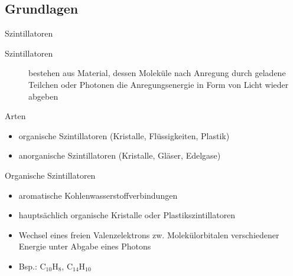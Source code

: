 \subsection[]{Grundlagen}

\begin{frame}{Szintillatoren}

\begin{description}
	  \item[Szintillatoren] bestehen aus Material, dessen Moleküle nach Anregung durch geladene
	  Teilchen oder Photonen die Anregungsenergie in Form von Licht wieder abgeben
	\end{description}
	\begin{block}{Arten}
		\begin{itemize}
		  \item organische Szintillatoren (Kristalle, Flüssigkeiten, Plastik)
		  \item anorganische Szintillatoren (Kristalle, Gläser, Edelgase)
		\end{itemize}
	\end{block}
	\begin{block}{Organische Szintillatoren}
		\begin{itemize}
		  \item aromatische Kohlenwasserstoffverbindungen
		  \item hauptsächlich organische Kristalle oder Plastikszintillatoren
		  \item Wechsel eines freien Valenzelektrons zw.
Molekülorbitalen verschiedener Energie unter Abgabe eines Photons
		  \item Bsp.: C$_{10}$H$_8$, C$_{14}$H$_{10}$
		\end{itemize}
	\end{block}
\end{frame}	


